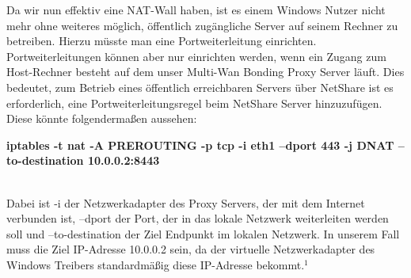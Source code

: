 Da wir nun effektiv eine NAT-Wall haben, ist es einem Windows Nutzer nicht mehr ohne weiteres möglich, öffentlich zugängliche Server auf seinem Rechner zu betreiben. Hierzu müsste man eine Portweiterleitung einrichten. Portweiterleitungen können aber nur einrichten werden, wenn ein Zugang zum Host-Rechner besteht auf dem unser Multi-Wan Bonding Proxy Server läuft. Dies bedeutet, zum Betrieb eines öffentlich erreichbaren Servers über NetShare ist es erforderlich, eine Portweiterleitungsregel beim NetShare Server hinzuzufügen. Diese könnte folgendermaßen aussehen:
\\ 
\begin{center}
    \textbf{iptables -t nat -A PREROUTING -p tcp -i eth1 --dport 443 -j DNAT --to-destination 10.0.0.2:8443}
\end{center}
\ \\
Dabei ist -i der Netzwerkadapter des Proxy Servers, der mit dem Internet verbunden ist, --dport der Port, der in das lokale Netzwerk weiterleiten werden soll und --to-destination der Ziel Endpunkt im lokalen Netzwerk. In unserem Fall muss die Ziel IP-Adresse 10.0.0.2 sein, da der virtuelle Netzwerkadapter des Windows Treibers standardmäßig diese IP-Adresse bekommt.$^{1}$